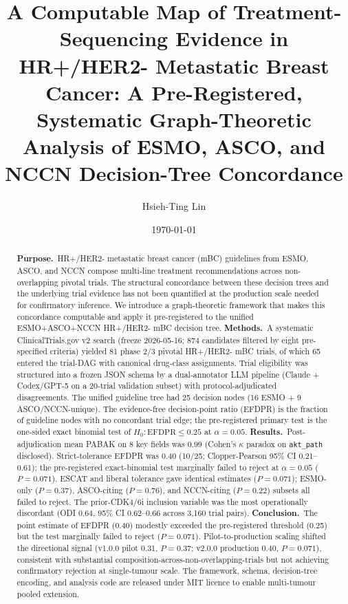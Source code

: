 \documentclass[11pt,a4paper]{article}
\title{\fontsize{15}{18}\bfseries\sffamily
A Computable Map of Treatment-Sequencing Evidence in HR+/HER2- Metastatic
Breast Cancer: A Pre-Registered, Systematic Graph-Theoretic Analysis of
ESMO, ASCO, and NCCN Decision-Tree Concordance}
\author[1,*]{Hsieh-Ting Lin}
\affil[1]{Department of Hematology \& Medical Oncology, Koo Foundation Sun Yat-Sen Cancer Center, 125 Lide Rd., Beitou Dist., Taipei 11259, Taiwan. ORCID iD: 0009-0002-3974-4528.}
\affil[*]{Correspondence: \texttt{htlin222@kfsyscc.org}.}
\date{\today}
\begin{document}
\maketitle
\thispagestyle{empty}
\vspace{-1.5em}

\begin{abstract}
\noindent
\textbf{Purpose.}\, HR+/HER2- metastatic breast cancer (mBC) guidelines from ESMO, ASCO, and NCCN compose multi-line treatment recommendations across non-overlapping pivotal trials. The structural concordance between these decision trees and the underlying trial evidence has not been quantified at the production scale needed for confirmatory inference. We introduce a graph-theoretic framework that makes this concordance computable and apply it pre-registered to the unified ESMO+ASCO+NCCN HR+/HER2- mBC decision tree.
\textbf{Methods.}\, A systematic ClinicalTrials.gov v2 search (freeze 2026-05-16; 874 candidates filtered by eight pre-specified criteria) yielded 81 phase 2/3 pivotal HR+/HER2- mBC trials, of which 65 entered the trial-DAG with canonical drug-class assignments. Trial eligibility was structured into a frozen JSON schema by a dual-annotator LLM pipeline (Claude + Codex/GPT-5 on a 20-trial validation subset) with protocol-adjudicated disagreements. The unified guideline tree had 25 decision nodes (16 ESMO + 9 ASCO/NCCN-unique). The evidence-free decision-point ratio (EFDPR) is the fraction of guideline nodes with no concordant trial edge; the pre-registered primary test is the one-sided exact binomial test of $H_0: \mathrm{EFDPR} \le 0.25$ at $\alpha = 0.05$.
\textbf{Results.}\, Post-adjudication mean PABAK on 8 key fields was 0.99 (Cohen's $\kappa$ paradox on \texttt{akt\_path} disclosed). Strict-tolerance EFDPR was 0.40 (10/25; Clopper-Pearson 95\% CI 0.21--0.61); the pre-registered exact-binomial test marginally failed to reject at $\alpha = 0.05$ ($P = 0.071$). ESCAT and liberal tolerance gave identical estimates ($P = 0.071$); ESMO-only ($P = 0.37$), ASCO-citing ($P = 0.76$), and NCCN-citing ($P = 0.22$) subsets all failed to reject. The prior-CDK4/6i inclusion variable was the most operationally discordant (ODI 0.64, 95\% CI 0.62--0.66 across 3,160 trial pairs).
\textbf{Conclusion.}\, The point estimate of EFDPR (0.40) modestly exceeded the pre-registered threshold (0.25) but the test marginally failed to reject ($P = 0.071$). Pilot-to-production scaling shifted the directional signal (v1.0.0 pilot 0.31, $P = 0.37$; v2.0.0 production 0.40, $P = 0.071$), consistent with substantial composition-across-non-overlapping-trials but not achieving confirmatory rejection at single-tumour scale. The framework, schema, decision-tree encoding, and analysis code are released under MIT licence to enable multi-tumour pooled extension.
\end{abstract}
\end{document}
